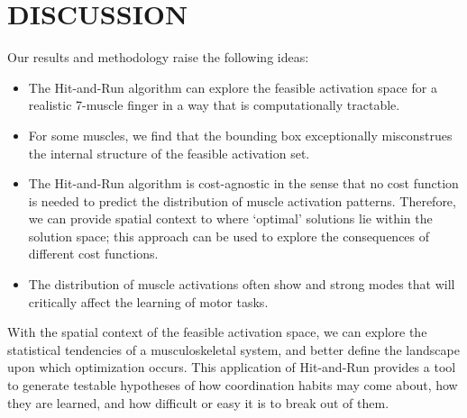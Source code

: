 \section{DISCUSSION}

Our results and methodology raise the following ideas:\\
{\begin{itemize}
	\item The Hit-and-Run algorithm can explore the feasible activation space for a realistic 7-muscle finger in a way that is computationally tractable.
	\item For some muscles, we find that the bounding box exceptionally misconstrues the internal structure of the feasible activation set.
	\item The Hit-and-Run algorithm is cost-agnostic in the sense that no cost function is needed to predict the distribution of muscle activation patterns. Therefore, we can provide spatial context to where `optimal' solutions lie within the solution space; this approach can be used to explore the consequences of different cost functions.
	\item The distribution of muscle activations often show and strong modes that will critically affect the learning of motor tasks.
\end{itemize}}
With the spatial context of the feasible activation space, we can explore the statistical tendencies of a musculoskeletal system, and better define the landscape upon which optimization occurs. This application of Hit-and-Run provides a tool to generate testable hypotheses of how coordination habits may come about, how they are learned, and how difficult or easy it is to break out of them. 




